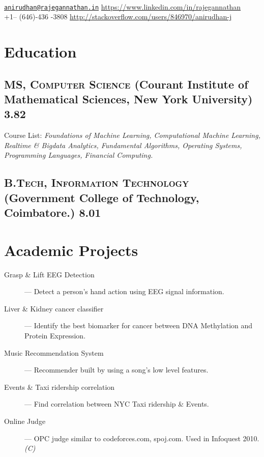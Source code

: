 \documentclass{resume}
\begin{document}
\\
{\href{mailto:anirudhan@rajegannathan.in}{\nolinkurl{anirudhan@rajegannathan.in}} \hfill \url{https://www.linkedin.com/in/rajegannathan}}\\
{+1-- (646)-436 -3808 \hfill \url{http://stackoverflow.com/users/846970/anirudhan-j}}

\section{Education}
\subsection[MS, Computer Science]{\textsc{MS, Computer Science}    \small{(Courant Institute of Mathematical Sciences, New York University)} \hfill \textbf{3.82}}%
  \begin{description}
    \item{Course List:} \textit{Foundations of Machine Learning, Computational Machine Learning, Realtime \& Bigdata Analytics, Fundamental Algorithms, Operating Systems, Programming Languages, Financial Computing.}
  \end{description}
\subsection[B.Tech, Information Technology]{\textsc{B.Tech, Information Technology}    \small{(Government College of Technology, Coimbatore.)} \hfill 8.01}%

\section{Academic Projects}
  \begin{description}
    \item[Grasp \& Lift EEG Detection] --- Detect a person's hand action using EEG signal information.
    \item[Liver \& Kidney cancer classifier] --- Identify the best biomarker for cancer between DNA Methylation and Protein Expression.
    \item[Music Recommendation System] --- Recommender built by using a song's low level features.
    \item[Events \& Taxi ridership correlation] --- Find correlation between NYC Taxi ridership \& Events.
    \item[Online Judge] --- OPC judge similar to codeforces.com, spoj.com.  Used in Infoquest 2010. \textit{(C)}
  \end{description}
\end{document}
